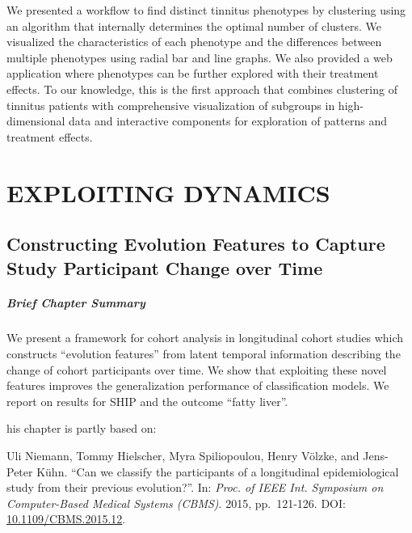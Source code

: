 \documentclass[
  oneside]{book}
\newenvironment{infobox}[1]
  {
  \begin{chapter-summary}
  }
  {
  \end{chapter-summary}
  }
\begin{document}
We presented a workflow to find distinct tinnitus phenotypes by clustering using an algorithm that internally determines the optimal number of clusters.
We visualized the characteristics of each phenotype and the differences between multiple phenotypes using radial bar and line graphs.
We also provided a web application where phenotypes can be further explored with their treatment effects.
To our knowledge, this is the first approach that combines clustering of tinnitus patients with comprehensive visualization of subgroups in high-dimensional data and interactive components for exploration of patterns and treatment effects.

\hypertarget{part-exploiting-dynamics}{%
\part{EXPLOITING DYNAMICS}\label{part-exploiting-dynamics}}

\hypertarget{evo}{%
\chapter{Constructing Evolution Features to Capture Study Participant Change over Time}\label{evo}}

\begin{infobox}{tasks.pdf}

\hypertarget{brief-chapter-summary-3}{%
\subsubsection*{Brief Chapter Summary}\label{brief-chapter-summary-3}}

We present a framework for cohort analysis in longitudinal cohort studies which constructs ``evolution features'' from latent temporal information describing the change of cohort participants over time.
We show that exploiting these novel features improves the generalization performance of classification models.
We report on results for SHIP and the outcome ``fatty liver''.

\end{infobox}

\begin{infobox}

This chapter is partly based on:

Uli Niemann, Tommy Hielscher, Myra Spiliopoulou, Henry Völzke, and Jens-Peter Kühn. ``Can we classify the participants of a longitudinal epidemiological study from their previous evolution?''. In: \emph{Proc. of IEEE Int. Symposium on Computer-Based Medical Systems (CBMS)}. 2015, pp.~121-126. DOI: \href{https://doi.org/10.1109\%2FCBMS.2015.12}{10.1109/CBMS.2015.12}.

\end{infobox}
\end{document}
